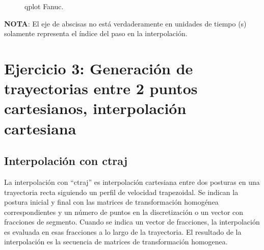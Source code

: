 \documentclass[a4paper,12pt]{article}
\begin{document}
\begin{figure}[H]
    \centering
    \begin{adjustbox}{scale = 0.65, max width=\columnwidth}
    \end{adjustbox}
    \caption{qplot Fanuc.}
    \label{qplot fanuc}
\end{figure}

\textbf{NOTA}: El eje de abscisas no está verdaderamente en unidades de tiempo (s)
solamente representa el índice del paso en la interpolación.

\section{Ejercicio 3:  Generación de trayectorias entre 2 puntos cartesianos, interpolación cartesiana}
\subsection{Interpolación con ctraj}
La interpolación con ``ctraj'' es interpolación cartesiana entre dos posturas en una trayectoria recta siguiendo un perfil de velocidad trapezoidal.
Se indican la postura inicial y final con las matrices de transformación homogénea correspondientes y un número de puntos
en la discretización o un vector con fracciones de segmento.
Cuando se indica un vector de fracciones, la interpolación es evaluada 
en esas fracciones a lo largo de la trayectoria.
El resultado de la interpolación es la secuencia de matrices de transformación homogenea.
\end{document}
